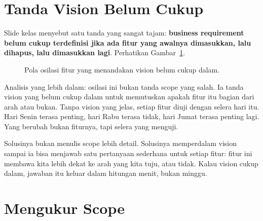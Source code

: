 \documentclass[11pt,a4paper]{article}
\begin{document}
\section{Tanda Vision Belum Cukup}

Slide kelas menyebut satu tanda yang sangat tajam: \textbf{business requirement belum cukup terdefinisi jika ada fitur yang awalnya dimasukkan, lalu dihapus, lalu dimasukkan lagi}. Perhatikan Gambar~\ref{fig:oscillation}.

\begin{figure}[H]
	\centering
	\caption{Pola osilasi fitur yang menandakan vision belum cukup dalam.}
	\label{fig:oscillation}
\end{figure}

Analisis yang lebih dalam: osilasi ini bukan tanda scope yang salah. Ia tanda vision yang belum cukup dalam untuk memutuskan apakah fitur itu bagian dari arah atau bukan. Tanpa vision yang jelas, setiap fitur diuji dengan selera hari itu. Hari Senin terasa penting, hari Rabu terasa tidak, hari Jumat terasa penting lagi. Yang berubah bukan fiturnya, tapi selera yang menguji.

Solusinya bukan menulis scope lebih detail. Solusinya memperdalam vision sampai ia bisa menjawab satu pertanyaan sederhana untuk setiap fitur: fitur ini membawa kita lebih dekat ke arah yang kita tuju, atau tidak. Kalau vision cukup dalam, jawaban itu keluar dalam hitungan menit, bukan minggu.

\section{Mengukur Scope}
\end{document}
